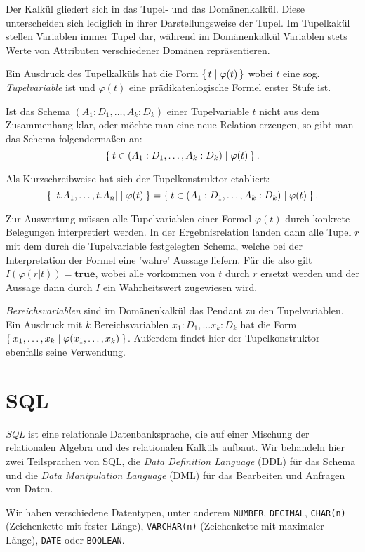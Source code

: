 \documentclass[a4paper,parskip=half*,DIV=15,fontsize=11pt]{scrartcl}
\begin{document}
Der Kalkül gliedert sich in das Tupel- und das Domänenkalkül. Diese unterscheiden sich lediglich in ihrer Darstellungsweise der Tupel. Im Tupelkakül stellen Variablen immer Tupel dar, während im Domänenkalkül Variablen stets Werte von Attributen verschiedener Domänen repräsentieren.

Ein Ausdruck des Tupelkalküls hat die Form $\set{ t | \varphi(t)}$ wobei $t$ eine sog. \textit{Tupelvariable} ist und $\varphi(t)$ eine prädikatenlogische Formel erster Stufe ist.

Ist das Schema $(A_1:D_1, \ldots, A_k:D_k)$ einer Tupelvariable $t$ nicht aus dem Zusammenhang klar, oder möchte man eine neue Relation erzeugen, so gibt man das Schema folgendermaßen an: $$\Set{t \in (A_1:D_1, \ldots, A_k:D_k) | \varphi(t)}.$$

Als Kurzschreibweise hat sich der Tupelkonstruktor etabliert: $$\Set{[t.A_1, \ldots, t.A_n] | \varphi(t)} = \Set{t \in (A_1:D_1, \ldots, A_k:D_k) | \varphi(t)}.$$

Zur Auswertung müssen alle Tupelvariablen einer Formel $\varphi(t)$ durch konkrete Belegungen interpretiert werden. In der Ergebnisrelation landen dann alle Tupel $r$ mit dem durch die Tupelvariable festgelegten Schema, welche bei der Interpretation der Formel eine 'wahre' Aussage liefern. Für die also gilt $I(\varphi(r|t)) = \textbf{true}$, wobei alle vorkommen von $t$ durch $r$ ersetzt werden und der Aussage dann durch $I$ ein Wahrheitswert zugewiesen wird.

\textit{Bereichsvariablen} sind im Domänenkalkül das Pendant zu den Tupelvariablen. Ein Ausdruck mit $k$ Bereichsvariablen $x_1:D_1, \ldots x_k:D_k$ hat die Form $\Set{x_1, \ldots, x_k | \varphi(x_1, \ldots, x_k)}$. Außerdem findet hier der Tupelkonstruktor ebenfalls seine Verwendung.
\section{SQL}

\emph{SQL} ist eine relationale Datenbanksprache, die auf einer Mischung der relationalen Algebra und des relationalen Kalküls aufbaut. Wir behandeln hier zwei Teilsprachen von SQL, die \emph{Data Definition Language} (DDL) für das Schema und die \emph{Data Manipulation Language} (DML) für das Bearbeiten und Anfragen von Daten.

Wir haben verschiedene Datentypen, unter anderem \lstinline{NUMBER}, \lstinline{DECIMAL}, \lstinline{CHAR(n)} (Zeichenkette mit fester Länge), \lstinline{VARCHAR(n)} (Zeichenkette mit maximaler Länge), \lstinline{DATE} oder \lstinline{BOOLEAN}.
\end{document}
